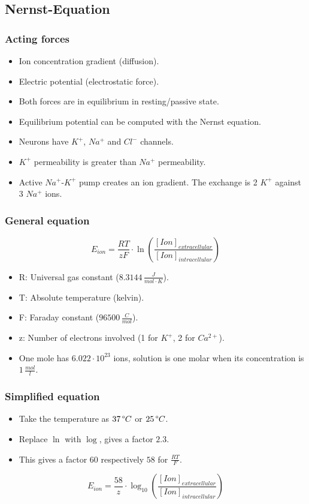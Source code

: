 \documentclass[main]{subfiles}
\begin{document}
\subsection{Nernst-Equation}
\subsubsection{Acting forces}
\begin{itemize}[noitemsep,nolistsep]
	\item Ion concentration gradient (diffusion).
	\item Electric potential (electrostatic force).
	\item Both forces are in equilibrium in resting/passive state.
	\item Equilibrium potential can be computed with the Nernst equation.
	\item Neurons have $K^+$, $Na^+$ and $Cl^-$ channels.
	\item $K^+$ permeability is greater than $Na^+$ permeability.
	\item Active $Na^+$-$K^+$ pump creates an ion gradient. The exchange is 2 $K^+$ against 3 $Na^+$ ions.
\end{itemize}

\subsubsection{General equation}
\[E_{ion}= \frac{RT}{zF} \cdot \ln (\frac{[Ion]_{extracellular}}{[Ion]_{intracellular}})\]
\begin{itemize}[noitemsep,nolistsep]
	\item R: Universal gas constant ($8.3144\,\frac{J}{mol \cdot K}$).
	\item T: Absolute temperature (kelvin).
	\item F: Faraday constant ($ 96500\,\frac{C}{mol}$).
	\item z: Number of electrons involved (1 for $K^+$, 2 for $Ca^{2+}$).
	\item One mole has $6.022\cdot10^{23}$ ions, solution is one molar when its concentration is $1\,\frac{mol}{l}$.
\end{itemize}

\subsubsection{Simplified equation}
\begin{itemize}[noitemsep,nolistsep]
	\item Take the temperature as $37\,\degree C$ or $25\,\degree C$.
	\item Replace $\ln$ with $\log$, gives a factor $2.3$.
	\item This gives a factor $60$ respectively $58$ for $\frac{RT}{F}$.
\end{itemize}
\[E_{ion}= \frac{58}{z} \cdot \log_{10} (\frac{[Ion]_{extracellular}}{[Ion]_{intracellular}})\]
\end{document}
